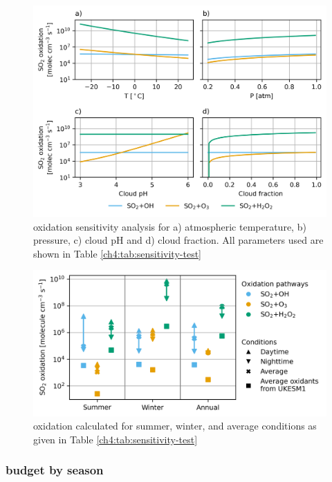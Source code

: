 \begin{figure}
    \centering
    \includegraphics{Chapter4/Figs/oxidation_sensitivity.png}
    \caption[ oxidation sensitivity analysis]{ oxidation sensitivity analysis for a) atmospheric temperature, b) pressure, c) cloud pH and d) cloud fraction. All parameters used are shown in Table \ref{ch4:tab:sensitivity-test}}
    \label{fig:ch4:oxidation-sensitivity}
\end{figure}

\begin{figure}
    \centering
    \includegraphics{Chapter4/Figs/theoretical_oxidation.png}
    \caption[ oxidation calculated for summer, winter, and average conditions]{ oxidation calculated for summer, winter, and average conditions as given in Table \ref{ch4:tab:sensitivity-test}}
    \label{fig:ch4:sensitivity-summary}
\end{figure}

\subsubsection{ budget by season}


